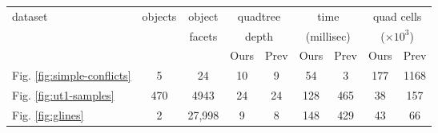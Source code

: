 \documentclass[final,3p,times,twocolumn]{elsarticle}
\begin{document}


\begin{table*}
  \centering
  \footnotesize{
  \begin{tabular}{lcc|cc|cc|cc}
    \toprule
    dataset & objects & object          & \multicolumn{2}{c|}{quadtree}
    & \multicolumn{2}{c|}{time} &  \multicolumn{2}{c}{quad cells} 
    \\
            &         & facets          & \multicolumn{2}{c|}{depth}
    & \multicolumn{2}{c|}{(millisec)} & \multicolumn{2}{c}{($\times 10^3$)}
    \\
            &         &  & Ours & Prev
    & Ours & Prev & Ours & Prev \\
    \hline

    Fig. \ref{fig:simple-conflicts} & 5 & 24 & 10 & 9 & 54 & 3 & 177 & 1168  \\

    Fig. \ref{fig:ut1-samples} & 470 & 4943 & 24 & 24 & 128 & 465 & 38 & 157  \\

    Fig. \ref{fig:glines} & 2 & 27,998 & 9 & 8 & 148 & 429 & 43 & 66  \\


\end{tabular}}
\end{table*}
\end{document}
